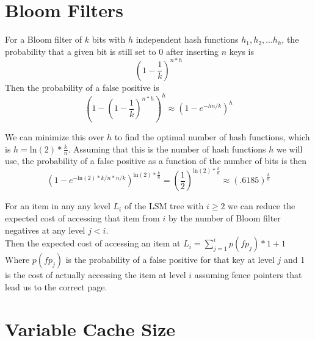 \documentclass[11pt]{article}
\theoremstyle{plain}
\theoremstyle{definition}
\begin{document}
\section{Bloom Filters}

For a Bloom filter of $k$ bits with $h$ independent hash functions $h_1, h_2,...h_h$, the probability that a given bit is still set to 0 after inserting $n$ keys is 
$$
(1 - \frac{1}{k})^{n*h}
$$
Then the probability of a false positive is 
$$
(1- (1 - \frac{1}{k})^{n*h})^h \approx (1 - e^{-hn/k})^h
$$

We can minimize this over $h$ to find the optimal number of hash functions, which is $h = \mathrm{ln}(2) * \frac{k}{n}$. Assuming that this is the number of hash functions $h$ we will use, the probability of a false positive as a function of the number of bits is then 
$$
(1 - e^{-\mathrm{ln}(2)*k/n*n/k})^{\mathrm{ln}(2) * \frac{k}{n}} = (\frac{1}{2}) ^ {\mathrm{ln}(2) * \frac{k}{n}} \approx (.6185) ^  {\frac{k}{n}}
$$

For an item in any any level $L_i$ of the LSM tree with $i \geq 2$ we can reduce the expected cost of accessing that item from $i$ by the number of Bloom filter negatives at any level $j<i$. \\ 
Then the expected cost of accessing an item at $L_i =  \sum_{j=1}^i p(fp_j) * 1 + 1$ \\
Where $p(fp_j)$ is the probability of a false positive for that key at level $j$ and 1 is the cost of actually accessing the item at level $i$ assuming fence pointers that lead us to the correct page.

\section{Variable Cache Size}
 
\end{document}
